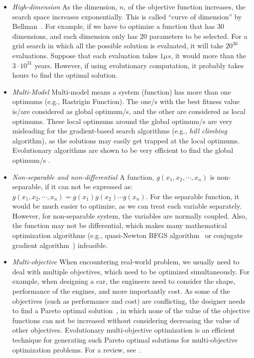 \begin{itemize}

\item \textit{High-dimension} As the dimension, $n$, of the objective function increases, the search space increases exponentially. This is called ``curve of dimension'' by Bellman~\cite{Bellman1957}. For example, if we have to optimize a function that has $30$ dimensions, and each dimension only has $20$ parameters to be selected. For a grid search in which all the possible solution is evaluated, it will take $20^{30}$ evaluations. Suppose that each evaluation takes $1\mu s$, it would more than the $3\cdot 10^{31}$ years. However, if using evolutionary computation, it probably takes hours to find the optimal solution. 

\item \textit{Multi-Model} Multi-model means a system (function) has more than one optimums (e.g., Rastrigin Function). The one/s with the best fitness value is/are considered as global optimum/s, and the other are considered as local optimums. These local optimums around the global optimum/s are very misleading for the gradient-based search algorithms (e.g., \textit{hill climbing} algorithm), as the solutions may easily get trapped at the local optimums. Evolutionary algorithms are shown to be very efficient to find the global optimum/s \cite{Hansen2003}. %

\item \textit{Non-separable and non-differential} A function, $g(x_1, x_2, \cdots, x_n)$ is non-separable, if it can not be expressed as: $g(x_1, x_2, \cdots, x_n) = g(x_1)g(x_2) \cdots g(x_n)$. For the separable function, it would be much easier to optimize, as we can treat each variable separately. However, for non-separable system, the variables are normally coupled. Also, the function may not be differential, which makes many mathematical optimization algorithms (e.g., quasi-Newton BFGS algorithm~\cite{Dennis1977} or conjugate gradient algorithm~\cite{Shewchuk1994}) infeasible. %

\item \textit{Multi-objective} When encountering real-world problem, we usually need to deal with multiple objectives, which need to be optimized simultaneously. For example, when designing a car, the engineers need to consider the shape, performance of the engines, and more importantly cost. As some of the objectives (such as performance and cost) are conflicting, the designer needs to find a Pareto optimal solution~\cite{Fonseca1995}, in which none of the value of the objective functions can not be increased without considering decreasing the value of other objectives. Evolutionary multi-objective optimization is an efficient technique for generating such Pareto optimal solutions for multi-objective optimization problems. For a review, see~\cite{Fonseca1995}. 


\end{itemize}
